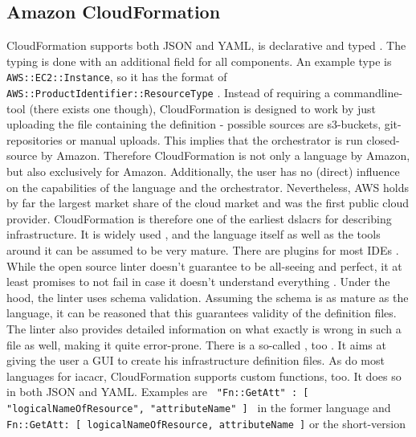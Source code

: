 \subsection{Amazon CloudFormation}
CloudFormation supports both JSON and YAML, is declarative and typed \cite{aws_cfn_concept}. The typing is done with an additional field  for all components. An example type is \texttt{AWS::EC2::Instance}, so it has the format of \texttt{AWS::ProductIdentifier::ResourceType} \cite{aws_cfn_concept}.
\newline
Instead of requiring a commandline-tool (there exists one \cite{aws_cf_cli} though), CloudFormation is designed to work by just uploading the file containing the definition - possible sources are s3-buckets, git-repositories or manual uploads. This implies that the orchestrator is run closed-source by Amazon. Therefore CloudFormation is not only a language by Amazon, but also exclusively for Amazon. Additionally, the user has no (direct) influence on the capabilities of the language and the orchestrator.
\newline
Nevertheless, AWS holds by far the largest market share of the cloud market \cite{statista_marketshare_cloud} and was the first public cloud provider. CloudFormation is therefore one of the earliest \gls{dslacr}s for describing infrastructure. It is widely used \cite{stackshare_aws_cloudformation}, and the language itself as well as the tools around it can be assumed to be very mature. There are plugins for most IDEs \cite{github_cfn_lint}. While the open source linter doesn't guarantee to be all-seeing and perfect, it at least promises to not fail in case it doesn't understand everything \cite{github_cfn_lint}. Under the hood, the linter uses schema validation. Assuming the schema is as mature as the language, it can be reasoned that this guarantees validity of the definition files. The linter also provides detailed information on what exactly is wrong in such a file as well, making it quite error-prone. There is a so-called , too \cite{aws_cloudformation_designer}. It aims at giving the user a GUI to create his infrastructure definition files.
\newline
As do most languages for \gls{iacacr}, CloudFormation supports custom functions, too. It does so in both JSON and YAML. Examples are
\newline %
\texttt{{ "Fn::GetAtt" : [ "logicalNameOfResource", "attributeName" ] }} in the former language and \texttt{Fn::GetAtt: [ logicalNameOfResource, attributeName ]} or the short-version
